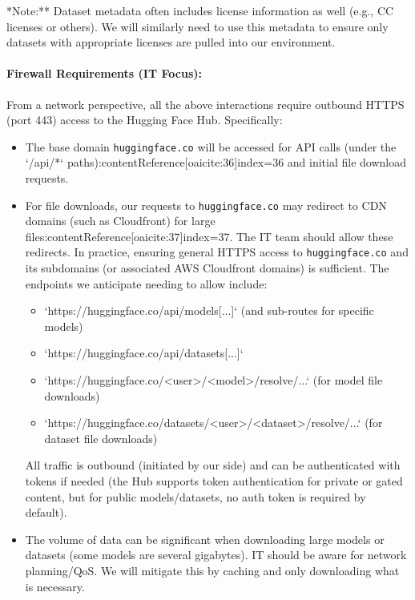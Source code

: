 \documentclass{article}
\begin{document}
\noindent **Note:** Dataset metadata often includes license information as well (e.g., CC licenses or others). We will similarly need to use this metadata to ensure only datasets with appropriate licenses are pulled into our environment.

\paragraph{Firewall Requirements (IT Focus):} From a network perspective, all the above interactions require outbound HTTPS (port 443) access to the Hugging Face Hub. Specifically:
\begin{itemize}
    \item The base domain \texttt{huggingface.co} will be accessed for API calls (under the `/api/*` paths):contentReference[oaicite:36]{index=36} and initial file download requests. 
    \item For file downloads, our requests to \texttt{huggingface.co} may redirect to CDN domains (such as Cloudfront) for large files:contentReference[oaicite:37]{index=37}. The IT team should allow these redirects. In practice, ensuring general HTTPS access to \texttt{huggingface.co} and its subdomains (or associated AWS Cloudfront domains) is sufficient. The endpoints we anticipate needing to allow include:
          \begin{itemize}
            \item `https://huggingface.co/api/models[...]` (and sub-routes for specific models)
            \item `https://huggingface.co/api/datasets[...]`
            \item `https://huggingface.co/<user>/<model>/resolve/...` (for model file downloads)
            \item `https://huggingface.co/datasets/<user>/<dataset>/resolve/...` (for dataset file downloads)
          \end{itemize}
          All traffic is outbound (initiated by our side) and can be authenticated with tokens if needed (the Hub supports token authentication for private or gated content, but for public models/datasets, no auth token is required by default).
    \item The volume of data can be significant when downloading large models or datasets (some models are several gigabytes). IT should be aware for network planning/QoS. We will mitigate this by caching and only downloading what is necessary.
\end{itemize}
\end{document}
